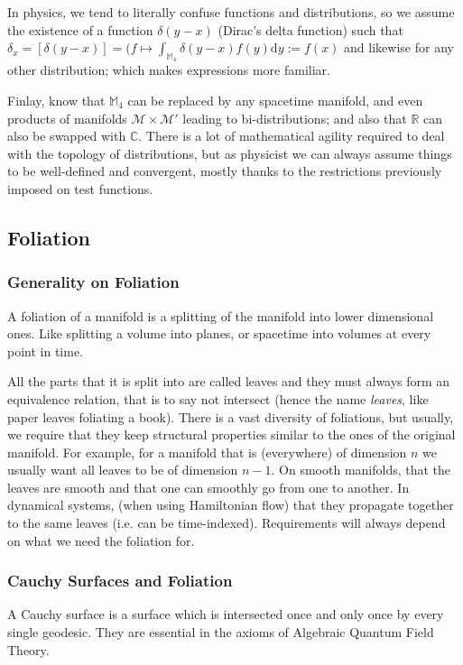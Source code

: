 \documentclass[a4paper,11pt]{article}
\numberwithin{equation}{section}
\theoremstyle{definition}
\renewcommand{\d}{{\mathrm{d}}}
\begin{document}
    In physics, we tend to literally confuse functions and distributions, so we assume the existence of a function $\delta(y-x)$ (Dirac's delta function) such that $\delta_x=[\delta(y-x)]=(f\mapsto \int_{\mathbb{M}_4}\delta(y-x)f(y)\d y:=f(x)$ and likewise for any other distribution; which makes expressions more familiar.

    Finlay, know that $\mathbb{M}_4$ can be replaced by any spacetime manifold, and even products of manifolds $\mathcal{M}\times\mathcal{M}'$ leading to bi-distributions; and also that $\mathbb{R}$ can also be swapped with $\mathbb{C}$. There is a lot of mathematical agility required to deal with the topology of distributions, but as physicist we can always assume things to be well-defined and convergent, mostly thanks to the restrictions previously imposed on test functions.

\subsection{Foliation}\label{PhyFoli}
    \subsubsection{Generality on Foliation}
    A foliation of a manifold is a splitting of the manifold into lower dimensional ones. Like splitting a volume into planes, or spacetime into volumes at every point in time.

    All the parts that it is split into are called leaves and they must always form an equivalence relation, that is to say not intersect (hence the name \textit{leaves}, like paper leaves foliating a book). There is a vast diversity of foliations, but usually, we require that they keep structural properties similar to the ones of the original manifold. For example, for a manifold that is (everywhere) of dimension $n$ we usually want all leaves to be of dimension $n-1$. On smooth manifolds, that the leaves are smooth and that one can smoothly go from one to another. In dynamical systems, (when using Hamiltonian flow) that they propagate together to the same leaves (i.e. can be time-indexed). Requirements will always depend on what we need the foliation for.

\subsubsection{Cauchy Surfaces and Foliation}\label{CauchyPhy}
    A Cauchy surface is a surface which is intersected once and only once by every single geodesic. They are essential in the axioms of Algebraic Quantum Field Theory.
\end{document}
